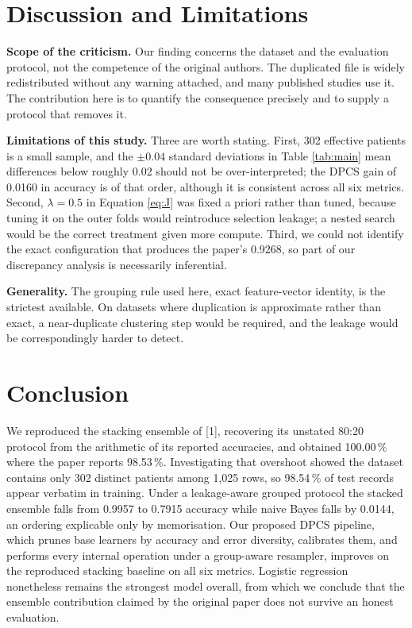 \documentclass[11pt,a4paper]{article}
\begin{document}
\section{Discussion and Limitations}

\textbf{Scope of the criticism.} Our finding concerns the dataset and the
evaluation protocol, not the competence of the original authors. The duplicated
file is widely redistributed without any warning attached, and many published
studies use it. The contribution here is to quantify the consequence precisely
and to supply a protocol that removes it.

\textbf{Limitations of this study.} Three are worth stating. First, 302 effective
patients is a small sample, and the $\pm0.04$ standard deviations in
Table \ref{tab:main} mean differences below roughly 0.02 should not be
over-interpreted; the DPCS gain of 0.0160 in accuracy is of that order, although
it is consistent across all six metrics. Second, $\lambda=0.5$ in
Equation \eqref{eq:J} was fixed a priori rather than tuned, because tuning it on
the outer folds would reintroduce selection leakage; a nested search would be the
correct treatment given more compute. Third, we could not identify the exact
configuration that produces the paper's 0.9268, so part of our discrepancy
analysis is necessarily inferential.

\textbf{Generality.} The grouping rule used here, exact feature-vector identity,
is the strictest available. On datasets where duplication is approximate rather
than exact, a near-duplicate clustering step would be required, and the leakage
would be correspondingly harder to detect.

\section{Conclusion}

We reproduced the stacking ensemble of [1], recovering its unstated
80:20 protocol from the arithmetic of its reported accuracies, and obtained
100.00\,\% where the paper reports 98.53\,\%. Investigating that overshoot showed
the dataset contains only 302 distinct patients among 1{,}025 rows, so 98.54\,\%
of test records appear verbatim in training. Under a leakage-aware grouped
protocol the stacked ensemble falls from 0.9957 to 0.7915 accuracy while naive
Bayes falls by 0.0144, an ordering explicable only by memorisation. Our proposed
DPCS pipeline, which prunes base learners by accuracy and error diversity,
calibrates them, and performs every internal operation under a group-aware
resampler, improves on the reproduced stacking baseline on all six metrics.
Logistic regression nonetheless remains the strongest model overall, from which
we conclude that the ensemble contribution claimed by the original paper does not
survive an honest evaluation.
\end{document}
